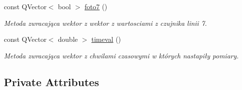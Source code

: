 \begin{DoxyCompactItemize}
const Q\+Vector$<$ bool $>$ \hyperlink{class_data_abf339451d0518296a832e91021cbeff6}{foto7} ()
\begin{DoxyCompactList}\small\item\em Metoda zwracająca wektor z wektor z wartosciami z czujnika linii 7. \end{DoxyCompactList}\item 
const Q\+Vector$<$ double $>$ \hyperlink{class_data_a709a752b98cd4784c414b99e9ead0e8c}{timeval} ()
\begin{DoxyCompactList}\small\item\em Metoda zwracająca wektor z chwilami czasowymi w których nastapiły pomiary. \end{DoxyCompactList}\end{DoxyCompactItemize}
\subsection*{Private Attributes}
